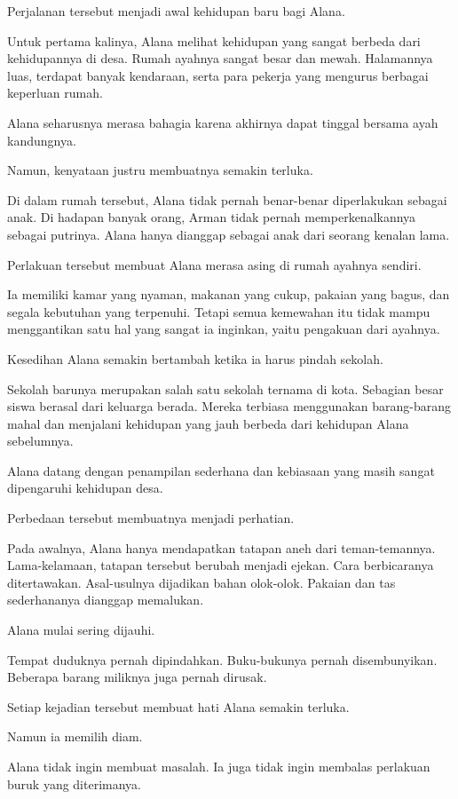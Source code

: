 Perjalanan tersebut menjadi awal kehidupan baru bagi Alana.

Untuk pertama kalinya, Alana melihat kehidupan yang sangat berbeda dari kehidupannya di desa. Rumah ayahnya sangat besar dan mewah. Halamannya luas, terdapat banyak kendaraan, serta para pekerja yang mengurus berbagai keperluan rumah.

Alana seharusnya merasa bahagia karena akhirnya dapat tinggal bersama ayah kandungnya.

Namun, kenyataan justru membuatnya semakin terluka.

Di dalam rumah tersebut, Alana tidak pernah benar-benar diperlakukan sebagai anak. Di hadapan banyak orang, Arman tidak pernah memperkenalkannya sebagai putrinya. Alana hanya dianggap sebagai anak dari seorang kenalan lama.

Perlakuan tersebut membuat Alana merasa asing di rumah ayahnya sendiri.

Ia memiliki kamar yang nyaman, makanan yang cukup, pakaian yang bagus, dan segala kebutuhan yang terpenuhi. Tetapi semua kemewahan itu tidak mampu menggantikan satu hal yang sangat ia inginkan, yaitu pengakuan dari ayahnya.

Kesedihan Alana semakin bertambah ketika ia harus pindah sekolah.

Sekolah barunya merupakan salah satu sekolah ternama di kota. Sebagian besar siswa berasal dari keluarga berada. Mereka terbiasa menggunakan barang-barang mahal dan menjalani kehidupan yang jauh berbeda dari kehidupan Alana sebelumnya.

Alana datang dengan penampilan sederhana dan kebiasaan yang masih sangat dipengaruhi kehidupan desa.

Perbedaan tersebut membuatnya menjadi perhatian.

Pada awalnya, Alana hanya mendapatkan tatapan aneh dari teman-temannya. Lama-kelamaan, tatapan tersebut berubah menjadi ejekan. Cara berbicaranya ditertawakan. Asal-usulnya dijadikan bahan olok-olok. Pakaian dan tas sederhananya dianggap memalukan.

Alana mulai sering dijauhi.

Tempat duduknya pernah dipindahkan. Buku-bukunya pernah disembunyikan. Beberapa barang miliknya juga pernah dirusak.

Setiap kejadian tersebut membuat hati Alana semakin terluka.

Namun ia memilih diam.

Alana tidak ingin membuat masalah. Ia juga tidak ingin membalas perlakuan buruk yang diterimanya.


